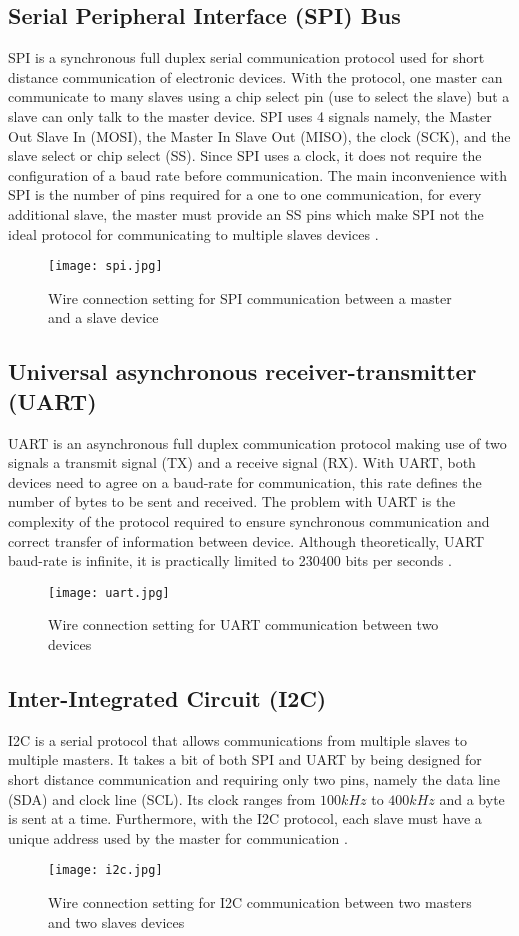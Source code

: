 \subsection{Serial Peripheral Interface (SPI) Bus}
SPI is a synchronous full duplex serial communication protocol used for short distance communication of electronic devices. With the protocol, one master can communicate to many slaves using a chip select pin (use to select the slave) but a slave can only talk to the master device. SPI uses 4 signals namely, the Master Out Slave In (MOSI), the Master In Slave Out (MISO), the clock (SCK), and the slave select or chip select (SS). Since SPI uses a clock, it does not require the configuration of a baud rate before communication. The main inconvenience with SPI is the number of pins required for a one to one communication, for every additional slave, the master must provide an SS pins which make SPI not the ideal protocol for communicating to multiple slaves devices \cite{spi}. 
\begin{figure}[h!]
\centering
\texttt{[image: spi.jpg]}
\caption{Wire connection setting for SPI communication between a master and a slave device}
\label{fig:spi_coms}
\end{figure}
\subsection{Universal asynchronous receiver-transmitter (UART)}
UART is an asynchronous full duplex communication protocol making use of two signals a transmit signal (TX) and a receive signal (RX). With UART, both devices need to agree on a baud-rate for communication, this rate defines the number of bytes to be sent and received. The problem with UART is the complexity of the protocol required to ensure synchronous communication and correct transfer of information between device. Although theoretically, UART baud-rate is infinite, it is practically limited to 230400 bits per seconds \cite{uart}.   
\begin{figure}[h!]
\centering
\texttt{[image: uart.jpg]}
\caption{Wire connection setting for UART communication between two devices}
\label{fig:uart_coms}
\end{figure}
\subsection{Inter-Integrated Circuit (I2C)}
I2C is a serial protocol that allows communications from multiple slaves to multiple masters. It takes a bit of both SPI and UART by being designed for short distance communication and requiring only two pins, namely the data line (SDA) and clock line (SCL). Its clock ranges from $100kHz$ to $400kHz$ and a byte is sent at a time. Furthermore, with the I2C protocol, each slave must have a unique address used by the master for communication \cite{i2c}.  
\begin{figure}[h!]
\centering
\texttt{[image: i2c.jpg]}
\caption{Wire connection setting for I2C communication between two masters and two slaves devices}
\label{fig:i2c_coms}
\end{figure}
